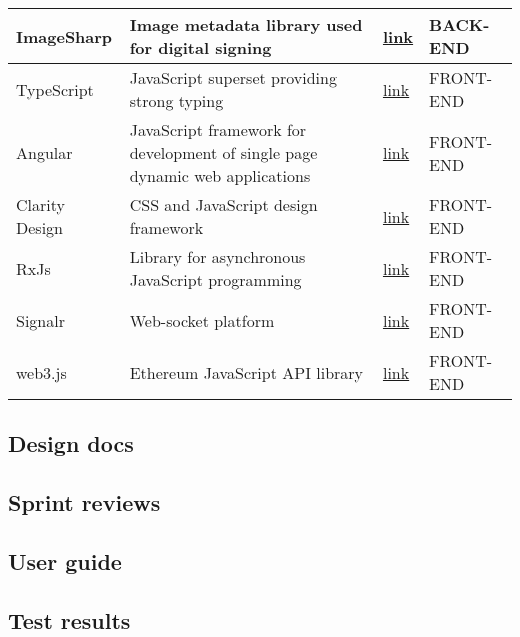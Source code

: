 \begin{table}[H]
\begin{tabular}{|p{}|p{}|p{}|p{}|}
ImageSharp     & Image metadata library used for digital signing                                       & \href{https://github.com/SixLabors/ImageSharp}{link}           & BACK-END  \\ \hline
TypeScript     & JavaScript superset providing strong typing                                           & \href{https://www.typescriptlang.org/}{link}                   & FRONT-END \\ \hline
Angular        & JavaScript framework for development of single page dynamic web applications          & \href{https://angular.io/}{link}                               & FRONT-END \\ \hline
Clarity Design & CSS and JavaScript design framework                                                   & \href{https://clarity.design/}{link}                           & FRONT-END \\ \hline
RxJs           & Library for asynchronous JavaScript programming                                       & \href{https://rxjs.dev/}{link}                                 & FRONT-END \\ \hline
Signalr        & Web-socket platform                                                                   & \href{https://www.npmjs.com/package/@microsoft/signalr}{link}  & FRONT-END \\ \hline
web3.js        & Ethereum JavaScript API library                                                       & \href{https://www.npmjs.com/package/web3}{link}                & FRONT-END \\ \hline
\end{tabular}
\end{table}

\subsection{Design docs}
\subsection{Sprint reviews}
\subsection{User guide}



\subsection{Test results}
\label{sec:test-results}

